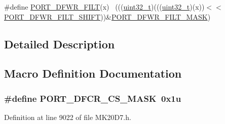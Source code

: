 \begin{DoxyCompactItemize}
\item 
\#define \hyperlink{group___p_o_r_t___register___masks_gad657e805a001c463d29fc307ecd4103e}{P\+O\+R\+T\+\_\+\+D\+F\+W\+R\+\_\+\+F\+I\+LT}(x)                                            ~(((\hyperlink{_p_e___types_8h_a33594304e786b158f3fb30289278f5af}{uint32\+\_\+t})(((\hyperlink{_p_e___types_8h_a33594304e786b158f3fb30289278f5af}{uint32\+\_\+t})(x))$<$$<$\hyperlink{group___p_o_r_t___register___masks_ga9045bd83bc548178d057bf4916c8fe08}{P\+O\+R\+T\+\_\+\+D\+F\+W\+R\+\_\+\+F\+I\+L\+T\+\_\+\+S\+H\+I\+FT}))\&\hyperlink{group___p_o_r_t___register___masks_gaf2f0bbe1dea504156dce840fdcb94b74}{P\+O\+R\+T\+\_\+\+D\+F\+W\+R\+\_\+\+F\+I\+L\+T\+\_\+\+M\+A\+SK})
\end{DoxyCompactItemize}


\subsection{Detailed Description}


\subsection{Macro Definition Documentation}
\subsubsection[{\texorpdfstring{P\+O\+R\+T\+\_\+\+D\+F\+C\+R\+\_\+\+C\+S\+\_\+\+M\+A\+SK}{PORT_DFCR_CS_MASK}}]{\setlength{\rightskip}{0pt plus 5cm}\#define P\+O\+R\+T\+\_\+\+D\+F\+C\+R\+\_\+\+C\+S\+\_\+\+M\+A\+SK~0x1u}\hypertarget{group___p_o_r_t___register___masks_gadc66969dfb648b725cd30df406f7a2f9}{}\label{group___p_o_r_t___register___masks_gadc66969dfb648b725cd30df406f7a2f9}


Definition at line 9022 of file M\+K20\+D7.\+h.

